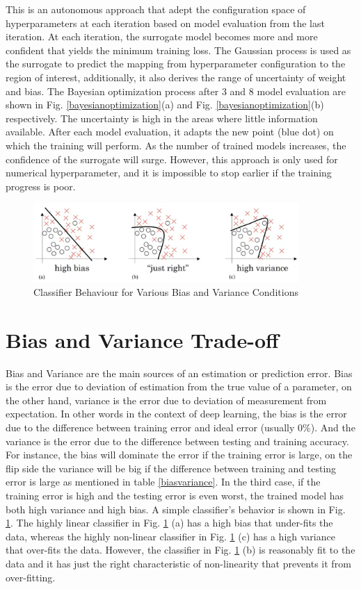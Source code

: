 This is an autonomous approach that adept the configuration space of hyperparameters at each iteration based on model evaluation from the last iteration. At each iteration, the surrogate model becomes more and more confident that yields the minimum training loss. The Gaussian process is used as the surrogate to predict the mapping from hyperparameter configuration to the region of interest, additionally, it also derives the range of uncertainty of weight and bias. The Bayesian optimization process after $3$ and $8$ model evaluation are shown in Fig. \ref{bayesianoptimization}(a) and Fig. \ref{bayesianoptimization}(b) respectively. The uncertainty is high in the areas where little information available. After each model evaluation, it adapts the new point (blue dot) on which the training will perform. As the number of trained models increases, the confidence of the surrogate will surge. However, this approach is only used for numerical hyperparameter, and it is impossible to stop earlier if the training progress is poor.  

\begin{figure}
    \centering
    \includegraphics[width=0.9\textwidth]{Images/tradeoff.png}
    \caption{Classifier Behaviour for Various Bias and Variance Conditions\cite{coursera1}}
    \label{tradeoff}
\end{figure}

\section{Bias and Variance Trade-off}
Bias and Variance are the main sources of an estimation or prediction error. Bias is the error due to deviation of estimation from the true value of a parameter, on the other hand, variance is the error due to deviation of measurement from expectation. In other words in the context of deep learning, the bias is the error due to the difference between training error and ideal error (usually $0\%$). And the variance is the error due to the difference between testing and training accuracy. For instance, the bias will dominate the error if the training error is large, on the flip side the variance will be big if the difference between training and testing error is large as mentioned in table \ref{biasvariance}. In the third case, if the training error is high and the testing error is even worst, the trained model has both high variance and high bias. A simple classifier's behavior is shown in Fig. \ref{tradeoff}. The highly linear classifier in Fig. \ref{tradeoff} (a) has a high bias that under-fits the data, whereas the highly non-linear classifier in Fig. \ref{tradeoff} (c) has a high variance that over-fits the data. However, the classifier in Fig. \ref{tradeoff} (b) is reasonably fit to the data and it has just the right characteristic of non-linearity that prevents it from over-fitting.             

